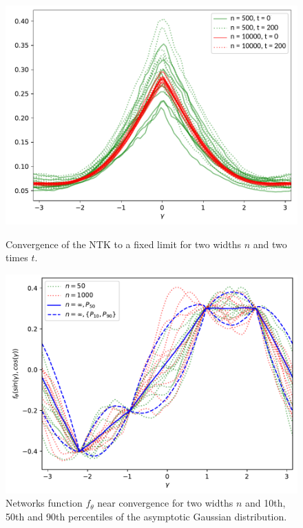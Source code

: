 \documentclass{article}
\begin{document}
\begin{figure}
    \centering
    \begin{minipage}[t]{0.49\textwidth}
        \centering
        \includegraphics[width=1.0\textwidth]{edited_circle_NTK_convergence_L4_beta01.pdf}
        \caption{Convergence of the NTK to a fixed limit for two widths $n$ and two times $t$.}
        \label{fig:NTK_convergence}
    \end{minipage}\;
    \begin{minipage}[t]{0.49\textwidth}
        \centering
        \includegraphics[width=1.0\textwidth]{circle_ANN_regression_4points_10tries_beta01_percentiles.pdf}
        \caption{Networks function $f_\theta$ near convergence for two widths $n$ and 10th, 50th and 90th percentiles of the asymptotic Gaussian distribution.}
        \label{fig:ANN_regression}
    \end{minipage}
\end{figure}
\end{document}
